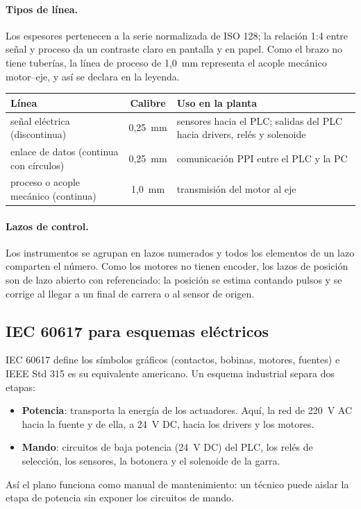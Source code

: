 \documentclass[a4paper,11pt]{article}
\begin{document}
\paragraph{Tipos de línea.} Los espesores pertenecen a la serie normalizada de ISO 128; la relación 1:4 entre señal y proceso da un contraste claro en pantalla y en papel. Como el brazo no tiene tuberías, la línea de proceso de 1,0~mm representa el acople mecánico motor--eje, y así se declara en la leyenda.
\begin{center}\small
\begin{tabularx}{\linewidth}{>{\raggedright}p{3.6cm} c >{\raggedright\arraybackslash}X}
\toprule
\textbf{Línea} & \textbf{Calibre} & \textbf{Uso en la planta}\\
\midrule
señal eléctrica (discontinua) & 0,25~mm & sensores hacia el PLC; salidas del PLC hacia drivers, relés y solenoide\\
enlace de datos (continua con círculos) & 0,25~mm & comunicación PPI entre el PLC y la PC\\
proceso o acople mecánico (continua) & 1,0~mm & transmisión del motor al eje\\
\bottomrule
\end{tabularx}\end{center}

\paragraph{Lazos de control.} Los instrumentos se agrupan en lazos numerados y todos los elementos de un lazo comparten el número. Como los motores no tienen encoder, los lazos de posición son de lazo abierto con referenciado: la posición se estima contando pulsos y se corrige al llegar a un final de carrera o al sensor de origen.

\subsection{IEC 60617 para esquemas eléctricos}
IEC 60617 define los símbolos gráficos (contactos, bobinas, motores, fuentes) e IEEE Std 315 es su equivalente americano. Un esquema industrial separa dos etapas:
\begin{itemize}
\item \textbf{Potencia}: transporta la energía de los actuadores. Aquí, la red de 220~V AC hacia la fuente y de ella, a 24~V DC, hacia los drivers y los motores.
\item \textbf{Mando}: circuitos de baja potencia (24~V DC) del PLC, los relés de selección, los sensores, la botonera y el solenoide de la garra.
\end{itemize}
Así el plano funciona como manual de mantenimiento: un técnico puede aislar la etapa de potencia sin exponer los circuitos de mando.
\end{document}

